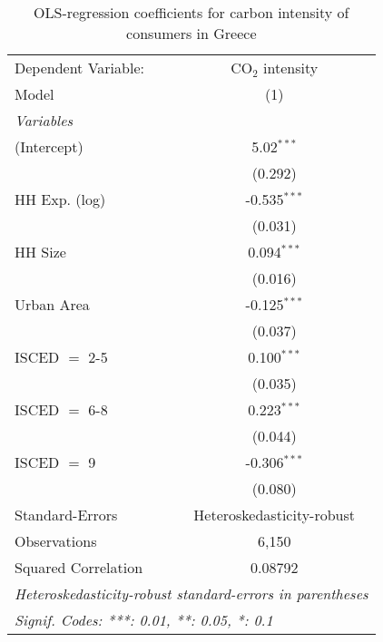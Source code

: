 
\begin{table}[htbp!]
   \centering
   \small
   \begin{adjustbox}{width = 1\textwidth, max height = 0.95\textheight, center}
      \begin{threeparttable}[b]
         \caption{\label{tab:OLS_1_GRC} OLS-regression coefficients for carbon intensity of consumers in Greece}
         \begin{tabular}{lc}
            \tabularnewline \midrule \midrule
            Dependent Variable: & CO$_{2}$ intensity\\  
            Model               & (1)\\  
            \midrule
            \emph{Variables}\\
            (Intercept)         & 5.02$^{***}$\\   
                                & (0.292)\\   
            HH Exp. (log)       & -0.535$^{***}$\\   
                                & (0.031)\\   
            HH Size             & 0.094$^{***}$\\   
                                & (0.016)\\   
            Urban Area          & -0.125$^{***}$\\   
                                & (0.037)\\   
            ISCED $=$ 2-5       & 0.100$^{***}$\\   
                                & (0.035)\\   
            ISCED $=$ 6-8       & 0.223$^{***}$\\   
                                & (0.044)\\   
            ISCED $=$ 9         & -0.306$^{***}$\\   
                                & (0.080)\\   
            \midrule 
            Standard-Errors     & Heteroskedasticity-robust \\   
            Observations        & 6,150\\  
            Squared Correlation & 0.08792\\  
            \midrule \midrule
            \multicolumn{2}{l}{\emph{Heteroskedasticity-robust standard-errors in parentheses}}\\
            \multicolumn{2}{l}{\emph{Signif. Codes: ***: 0.01, **: 0.05, *: 0.1}}\\
         \end{tabular}
         

\end{threeparttable}
\end{adjustbox}
\end{table}
